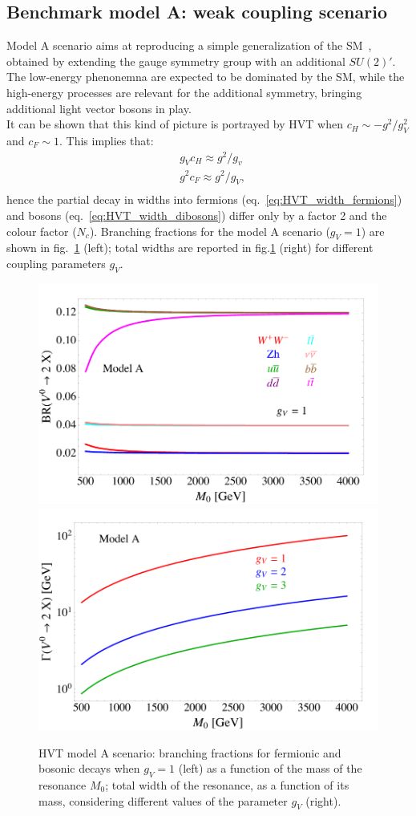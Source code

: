 \subsection{Benchmark model A: weak coupling scenario}
\label{sec:theory_HVT_A}
Model A scenario aims at reproducing a simple generalization of the SM~\cite{Barger:1980ix}, obtained by extending the gauge symmetry group with an additional $SU(2)'$. The low-energy phenonemna are expected to be dominated by the SM, while the high-energy processes are relevant for the additional symmetry, bringing additional light vector bosons in play.\\
It can be shown that this kind of picture is portrayed by HVT when $c_H \sim -g^2/g_V^2$ and $c_F \sim 1$. This implies that:
\begin{equation}
\begin{split}
 & g_V c_H \approx g^2/g_v\\
 & g^2 c_F \approx g^2/g_V,\\
\end{split}
\label{eq:theory_HVT_modelA}
\end{equation}
hence the partial decay in widths into fermions (eq.~\ref{eq:HVT_width_fermions}) and bosons (eq.~\ref{eq:HVT_width_dibosons}) differ only by a factor 2 and the colour factor ($N_c$). Branching fractions for the model A scenario ($g_V =1$) are shown in fig.~\ref{fig:HVT_modelA_BR_width} (left); total widths are reported in fig.\ref{fig:HVT_modelA_BR_width} (right) for different coupling parameters $g_V$.  

\begin{figure}[!htb]
  \centering
    \includegraphics[width=.495\textwidth]{figures/Figures_BRWC.png}%
    \includegraphics[width=.495\textwidth]{figures/Figures_WidthWC.png}
  \caption{HVT model A scenario: branching fractions for fermionic and bosonic decays when $g_V = 1$ (left) as a function of the mass of the resonance $M_0$; total width of the resonance, as a function of its mass, considering different values of the parameter $g_V$ (right).}
  \label{fig:HVT_modelA_BR_width}
\end{figure}

